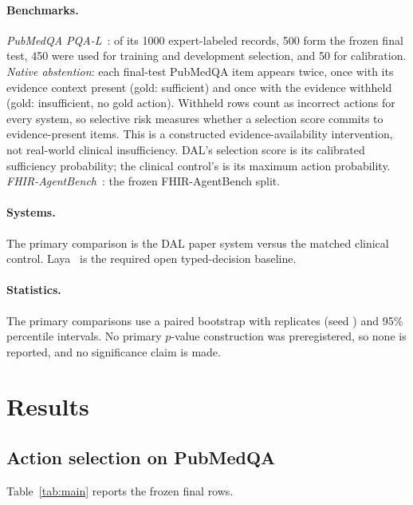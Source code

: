 \documentclass[11pt]{article}
\begin{document}
\paragraph{Benchmarks.}
\emph{PubMedQA PQA-L}~\citep{jin2019pubmedqa}: of its 1000 expert-labeled records, 500 form the frozen final test,
450 were used for training and development selection, and 50 for calibration. \emph{Native abstention}: each
final-test PubMedQA item appears twice, once with its evidence context present (gold: sufficient) and once with
the evidence withheld (gold: insufficient, no gold action). Withheld rows count as incorrect actions for every
system, so selective risk measures whether a selection score commits to evidence-present items. This is a
constructed evidence-availability intervention, not real-world clinical insufficiency. DAL's selection score
is its calibrated sufficiency probability; the clinical control's is its maximum action probability.
\emph{FHIR-AgentBench}~\citep{lee2026fhiragentbench}: the frozen FHIR-AgentBench split.

\paragraph{Systems.}
The primary comparison is the DAL paper system versus the matched clinical control. Laya~\citep{laya_repo} is the
required open typed-decision baseline.

\paragraph{Statistics.}
The primary comparisons use a paired bootstrap with  replicates (seed
) and 95\% percentile intervals. No primary $p$-value construction was
preregistered, so none is reported, and no significance claim is made.

\section{Results}
\label{sec:results}

\subsection{Action selection on PubMedQA}

Table~\ref{tab:main} reports the frozen final rows.  
 
\end{document}
